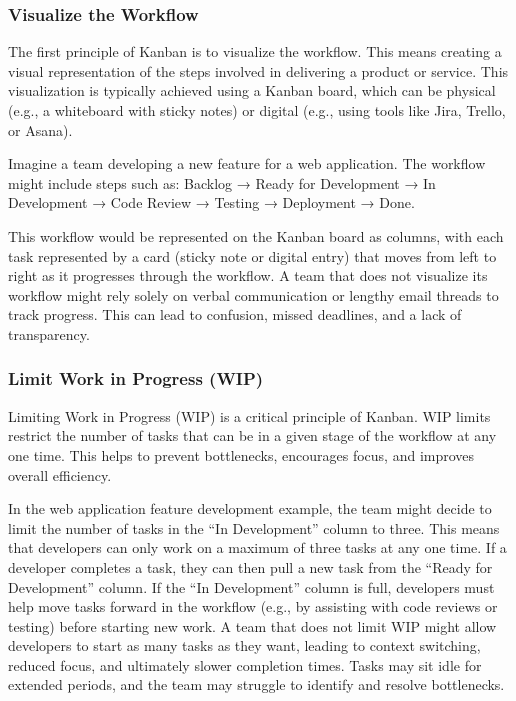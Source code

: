 \subsubsection{Visualize the Workflow}

The first principle of Kanban is to visualize the workflow. This means creating
a visual representation of the steps involved in delivering a product or
service. This visualization is typically achieved using a Kanban board, which
can be physical (e.g., a whiteboard with sticky notes) or digital (e.g., using
tools like Jira, Trello, or Asana).

\begin{examplecountercard}
  Imagine a team developing a new feature for a web application. The workflow might include steps such as: Backlog → Ready for Development → In Development → Code Review → Testing → Deployment → Done.

  This workflow would be represented on the Kanban board as columns, with each
  task represented by a card (sticky note or digital entry) that moves from left
  to right as it progresses through the workflow. \tcblower A team that does not
  visualize its workflow might rely solely on verbal communication or lengthy
  email threads to track progress. This can lead to confusion, missed deadlines,
  and a lack of transparency.
\end{examplecountercard}

\subsubsection{Limit Work in Progress (WIP)}

Limiting Work in Progress (WIP) is a critical principle of Kanban. WIP limits
restrict the number of tasks that can be in a given stage of the workflow at
any one time. This helps to prevent bottlenecks, encourages focus, and improves
overall efficiency.

\begin{examplecountercard}
  In the web application feature development example, the team might decide to limit the number of tasks in the ``In Development'' column to three. This means that developers can only work on a maximum of three tasks at any one time. If a developer completes a task, they can then pull a new task from the ``Ready for Development'' column. If the ``In Development'' column is full, developers must help move tasks forward in the workflow (e.g., by assisting with code reviews or testing) before starting new work.
  \tcblower
  A team that does not limit WIP might allow developers to start as many tasks as they want, leading to context switching, reduced focus, and ultimately slower completion times. Tasks may sit idle for extended periods, and the team may struggle to identify and resolve bottlenecks.
\end{examplecountercard}

